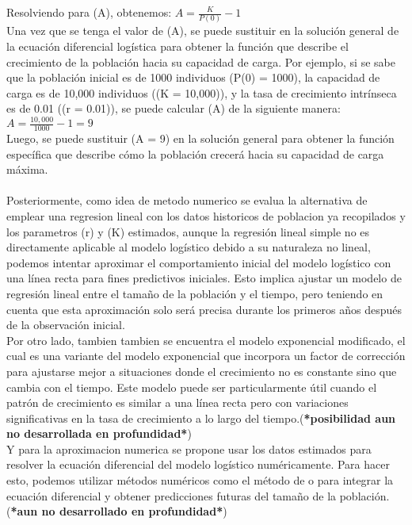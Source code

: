 \documentclass{article}
\begin{document}
Resolviendo para (A), obtenemos: $A = \frac{K}{P(0)} - 1$\\
Una vez que se tenga el valor de (A), se puede sustituir en la solución general de la ecuación diferencial 
logística para obtener la función que describe el crecimiento de la población hacia su capacidad de carga.
Por ejemplo, si se sabe que la población inicial es de 1000 individuos (P(0) = 1000), la capacidad de carga 
es de 10,000 individuos ((K = 10,000)), y la tasa de crecimiento intrínseca es de 0.01 ((r = 0.01)), 
se puede calcular (A) de la siguiente manera:\\
$A = \frac{10,000}{1000} - 1 = 9$\\
Luego, se puede sustituir (A = 9) en la solución general para obtener la función específica que describe cómo la 
población crecerá hacia su capacidad de carga máxima.\\\\
Posteriormente, como idea de metodo numerico se evalua la alternativa de emplear una regresion lineal con los datos
historicos de poblacion ya recopilados y los parametros (r) y (K) estimados, aunque la regresión lineal simple 
no es directamente aplicable al modelo logístico debido a su naturaleza no lineal, podemos intentar aproximar el 
comportamiento inicial del modelo logístico con una línea recta para fines predictivos iniciales. Esto implica 
ajustar un modelo de regresión lineal entre el tamaño de la población y el tiempo, pero teniendo en cuenta que esta 
aproximación solo será precisa durante los primeros años después de la observación inicial.\\
Por otro lado, tambien tambien se encuentra el modelo exponencial modificado, el cual es una variante del modelo 
exponencial que incorpora un factor de corrección para ajustarse mejor a situaciones donde el crecimiento no es 
constante sino que cambia con el tiempo. Este modelo puede ser particularmente útil cuando el patrón de crecimiento 
es similar a una línea recta pero con variaciones significativas en la tasa de crecimiento a lo largo del tiempo.(\textbf{*posibilidad aun no desarrollada en profundidad*})
\\
Y para la aproximacion numerica se propone usar los datos estimados para resolver la ecuación diferencial del modelo 
logístico numéricamente. Para hacer esto, podemos utilizar métodos numéricos como el método de  o  
para integrar la ecuación diferencial y obtener predicciones futuras del tamaño de la población.(\textbf{*aun no desarrollado en profundidad*})\\
\end{document}
